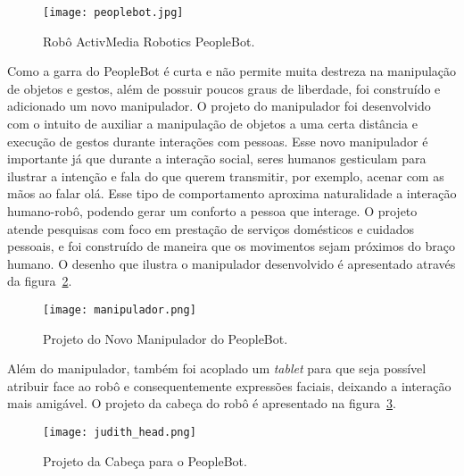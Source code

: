 \begin{figure}[ht!]
	\centering
	\begin{minipage}{\textwidth}
		\caption{Robô ActivMedia Robotics PeopleBot.}
		\texttt{[image: peoplebot.jpg]}
		\label{fig:peoplebot}
	\end{minipage}
\end{figure}

Como a garra do PeopleBot é curta e não permite muita destreza na manipulação de objetos e gestos, além de possuir poucos graus de liberdade, foi construído e adicionado um novo manipulador. O projeto do manipulador foi desenvolvido com o intuito de auxiliar a manipulação de objetos a uma certa distância e execução de gestos durante interações com pessoas. Esse novo manipulador é importante já que durante a interação social, seres humanos gesticulam para ilustrar a intenção e fala do que querem transmitir, por exemplo, acenar com as mãos ao falar olá. Esse tipo de comportamento aproxima naturalidade a interação humano-robô, podendo gerar um conforto a pessoa que interage. O projeto atende pesquisas com foco em prestação de serviços domésticos e cuidados pessoais, e foi construído de maneira que os movimentos sejam próximos do braço humano. O desenho que ilustra o manipulador desenvolvido é apresentado através da figura~\ref{fig:manipulador}.

\begin{figure}[ht!]
	\centering
	\begin{minipage}{0.6\textwidth}
		\caption{Projeto do Novo Manipulador do PeopleBot.}
		\texttt{[image: manipulador.png]}
		\label{fig:manipulador}
	\end{minipage}
\end{figure}

Além do manipulador, também foi acoplado um \emph{tablet} para que seja possível atribuir face ao robô e consequentemente expressões faciais, deixando a interação mais amigável. O projeto da cabeça do robô é apresentado na figura~\ref{fig:judithhead}.

\begin{figure}[ht!]
	\centering
	\begin{minipage}{0.4\textwidth}
		\caption{Projeto da Cabeça para o PeopleBot.}
		\texttt{[image: judith\_head.png]}
		\label{fig:judithhead}
	\end{minipage}
\end{figure}

